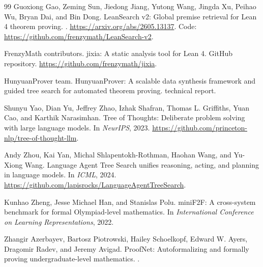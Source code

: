 \documentclass[11pt]{article}
\begin{document}
\begin{thebibliography}{99}
Guoxiong Gao, Zeming Sun, Jiedong Jiang, Yutong Wang, Jingda Xu, Peihao Wu,
Bryan Dai, and Bin Dong.
\newblock LeanSearch v2: Global premise retrieval for Lean 4 theorem proving.
.
\newblock \url{https://arxiv.org/abs/2605.13137}.
\newblock Code: \url{https://github.com/frenzymath/LeanSearch-v2}.

FrenzyMath contributors.
\newblock jixia: A static analysis tool for Lean 4.
\newblock GitHub repository.
\newblock \url{https://github.com/frenzymath/jixia}.

HunyuanProver team.
\newblock HunyuanProver: A scalable data synthesis framework and guided tree
search for automated theorem proving.
 technical report.

Shunyu Yao, Dian Yu, Jeffrey Zhao, Izhak Shafran, Thomas L. Griffiths, Yuan Cao,
and Karthik Narasimhan.
\newblock Tree of Thoughts: Deliberate problem solving with large language
models.
\newblock In \emph{NeurIPS}, 2023.
\newblock \url{https://github.com/princeton-nlp/tree-of-thought-llm}.

Andy Zhou, Kai Yan, Michal Shlapentokh-Rothman, Haohan Wang, and Yu-Xiong Wang.
\newblock Language Agent Tree Search unifies reasoning, acting, and planning in
language models.
\newblock In \emph{ICML}, 2024.
\newblock \url{https://github.com/lapisrocks/LanguageAgentTreeSearch}.

Kunhao Zheng, Jesse Michael Han, and Stanislas Polu.
\newblock miniF2F: A cross-system benchmark for formal Olympiad-level
mathematics.
\newblock In \emph{International Conference on Learning Representations}, 2022.

Zhangir Azerbayev, Bartosz Piotrowski, Hailey Schoelkopf, Edward W. Ayers,
Dragomir Radev, and Jeremy Avigad.
\newblock ProofNet: Autoformalizing and formally proving undergraduate-level
mathematics.
.

\end{thebibliography}
\end{document}
